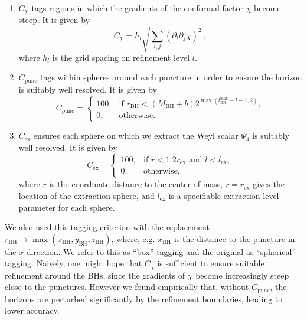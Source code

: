 \documentclass[floats,floatfix,showpacs,amssymb,physrev,twocolumn,superscriptaddress,reprint,
nofootinbib, longbibliography]{revtex4-2}
\begin{document}
\begin{enumerate}[label=(\roman*)]
    \item 
        $C_{\chi}$ tags regions in which the gradients of the conformal 
        factor $\chi$ become steep. It is given by
        \begin{equation}
            C_{\chi} = h_l\sqrt{\sum_{i,j}\left(
            \partial_i\partial_j\chi\right)^2}\,,
        \end{equation}
        where $h_l$ is the grid spacing on refinement level $l$.
    \item 
        $C_{\mathrm{punc}}$ tags within spheres around each puncture in 
        order to ensure the horizon is suitably well resolved. It is given 
        by
        \begin{equation}
            C_{\mathrm{punc}} = 
            \begin{cases}
                100, &\text{if } r_{\mathrm{BH}} < 
                (M_{\mathrm{BH}}+b) 2^{\max(l_\mathrm{BH}^{\max}-l-1, 2)}, \\
                0, & \text{otherwise}.
            \end{cases}
        \end{equation}
    \item
        $C_{\mathrm{ex}}$ ensures each sphere on which we extract the 
        Weyl scalar $\Psi_4$ is suitably well resolved. It is given by
        \begin{equation}
            C_{\mathrm{ex}} = 
            \begin{cases}
                100, &\text{if } r < 1.2r_{\mathrm{ex}} \text{ and } 
                l < l_{\mathrm{ex}}, \\
                0, & \text{otherwise},
            \end{cases}
        \end{equation}
         where $r$ is the coordinate distance to the center of mass,
         $r=r_{\mathrm{ex}}$ gives the location of the extraction sphere, 
         and $l_{\mathrm{ex}}$ is a specifiable extraction level parameter 
         for each sphere.
\end{enumerate}
We also used this tagging criterion with the replacement
$r_{\mathrm{BH}}\to
\max(x_{\mathrm{BH}},y_{\mathrm{BH}},z_{\mathrm{BH}})$, where,
e.g. $x_{\mathrm{BH}}$ is the distance to the puncture in the $x$
direction. We refer to this as ``box'' tagging and the original as
``spherical'' tagging. Naively, one might hope that $C_{\chi}$ is
sufficient to ensure suitable refinement around the BHs, since the
gradients of $\chi$ become increasingly steep close to the
punctures. However we found empirically that, without
$C_{\text{punc}}$, the horizons are perturbed significantly by the
refinement boundaries, leading to lower accuracy.




\end{document}
